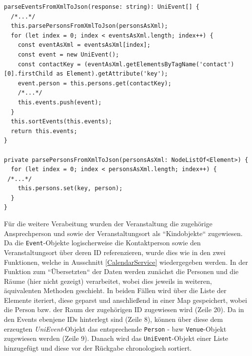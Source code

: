 \begin{lstlisting}[float, floatplacement=h, style=htmlcssjs, caption={Ausschnitt aus CalendarService}, label={CalendarService}]
parseEventsFromXmlToJson(response: string): UniEvent[] {
  /*...*/
  this.parsePersonsFromXmlToJson(personsAsXml);
  for (let index = 0; index < eventsAsXml.length; index++) {
    const eventAsXml = eventsAsXml[index];
    const event = new UniEvent();
    const contactKey = (eventAsXml.getElementsByTagName('contact')[0].firstChild as Element).getAttribute('key');
    event.person = this.persons.get(contactKey);
    /*...*/
    this.events.push(event);
  }
  this.sortEvents(this.events);
  return this.events;
}

private parsePersonsFromXmlToJson(personsAsXml: NodeListOf<Element>) {
  for (let index = 0; index < personsAsXml.length; index++) {
 /*...*/
    this.persons.set(key, person);
  }
}
\end{lstlisting}
Für die weitere Verabeitung wurden der Veranstaltung die zugehörige Ansprechperson und sowie der Veranstaltungsort als ``Kindobjekte`` zugewiesen. Da die \texttt{Event}-Objekte logischerweise die Kontaktperson sowie den Veranstaltungsort über deren ID referenzieren, wurde dies wie in den zwei Funktionen, welche in Ausschnitt \ref{CalendarService} wiedergegeben werden. In der Funktion zum ``Übersetzten`` der Daten werden zunächst die Personen und die Räume (hier nicht gezeigt) verarbeitet, wobei dies jeweils in weiteren, äquivalenten Methoden geschieht. In beiden Fällen wird über die Liste der Elemente iteriert, diese geparst und anschließend in einer Map gespeichert, wobei die Person bzw. der Raum der zugehörigen ID zugewiesen wird (Zeile 20). Da in den Events ebenjene IDs hinterlegt sind (Zeile 8), können über diese dem erzeugten \textit{UniEvent}-Objekt das entsprechende \texttt{Person} - bzw \texttt{Venue}-Objekt zugewiesen werden (Zeile 9). Danach wird das \texttt{UniEvent}-Objekt einer Liste hinzugefügt und diese vor der Rückgabe chronologisch sortiert.

